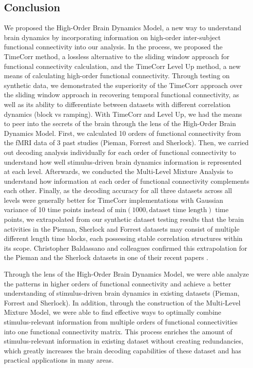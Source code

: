 \documentclass[11pt]{article}
\begin{document}
\begin{enumerate}
\section{Conclusion}
We proposed the High-Order Brain Dynamics Model, a new way to understand brain dynamics by incorporating information on high-order inter-subject functional connectivity into our analysis. In the process, we proposed the TimeCorr method, a lossless alternative to the sliding window approach for functional connectivity calculation, and the TimeCorr Level Up method, a new means of calculating high-order functional connectivity. Through testing on synthetic data, we demonstrated the superiority of the TimeCorr approach over the sliding window approach in recovering temporal functional connectivity, as well as its ability to differentiate between datasets with different correlation dynamics (block vs ramping). With TimeCorr and Level Up, we had the means to peer into the secrets of the brain through the lens of the High-Order Brain Dynamics Model. First, we calculated 10 orders of functional connectivity from the fMRI data of 3 past studies (Pieman, Forrest and Sherlock). Then, we carried out decoding analysis individually for each order of functional connectivity to understand how well stimulus-driven brain dynamics information is represented at each level. Afterwards, we conducted the Multi-Level Mixture Analysis to understand how information at each order of functional connectivity complements each other. Finally, as the decoding accuracy for all three datasets across all levels were generally better for TimeCorr implementations with Gaussian variance of 10 time points instead of $\text{min}(1000,\text{dataset time length})$ time points, we extrapolated from our synthetic dataset testing results that the brain activities in the Pieman, Sherlock and Forrest datasets may consist of multiple different length time blocks, each possessing stable correlation structures within its scope. Christopher Baldassano and colleagues confirmed this extrapolation for the Pieman and the Sherlock datasets in one of their recent papers \citep{Baldassano2016}.

Through the lens of the High-Order Brain Dynamics Model, we were able analyze the patterns in higher orders of functional connectivity and achieve a better understanding of stimulus-driven brain dynamics in existing datasets (Pieman, Forrest and Sherlock). In addition, through the construction of the Multi-Level Mixture Model, we were able to find effective ways to optimally combine stimulus-relevant information from multiple orders of functional connectivities into one functional connectivity matrix. This process enriches the amount of stimulus-relevant information in existing dataset without creating redundancies, which greatly increases the brain decoding capabilities of these dataset and has practical applications in many areas.


\end{enumerate}
\end{document}
